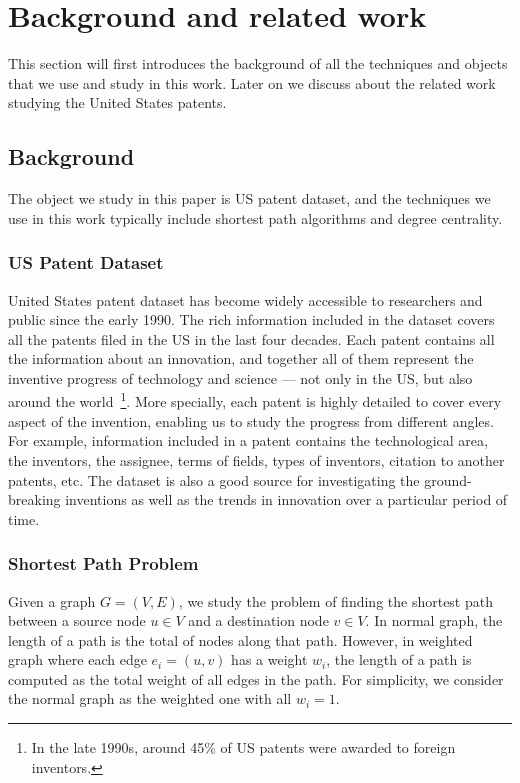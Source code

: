 \section{Background and related work}
This section will first introduces the background of all the techniques and objects that we use and study in
this work. Later on we discuss about the related work studying the United States patents.
\subsection{Background}
The object we study in this paper is US patent dataset, and the techniques we use in this work typically include
shortest path algorithms and degree centrality.
\subsubsection{US Patent Dataset}%
United States patent dataset has become widely
accessible to researchers and public since the early 1990. The rich
information included in the dataset covers all the patents filed in the US
in the last four decades. Each patent contains all the information about an
innovation, and together all of them represent the inventive progress of
technology and science --- not only in the US, but also around the
world~\footnote{In the late 1990s, around 45\% of US patents were awarded to
foreign inventors.}. More specially, each patent is highly detailed to cover
every aspect of the invention, enabling us to study the progress from
different angles. For example, information included in a patent contains  the
technological area, the inventors, the assignee,  terms of fields, types of
inventors, citation to another patents, etc. The dataset is also a good
source  for investigating the ground-breaking inventions as well as the trends in 
innovation over a particular period of time.
 
\subsubsection{Shortest Path Problem} 
%
Given a graph $G = (V, E)$, we study the problem of finding the shortest path
between a source node $u \in V$ and a destination node $v \in V$. In normal
graph, the length of a path is the total of nodes along that path. However, in
weighted graph where each edge $e_i = (u, v)$ has a weight $w_i$, the length
of a path is computed as the total weight of all edges in the path. For
simplicity, we consider the normal graph as the weighted one with all $w_i=1$.

